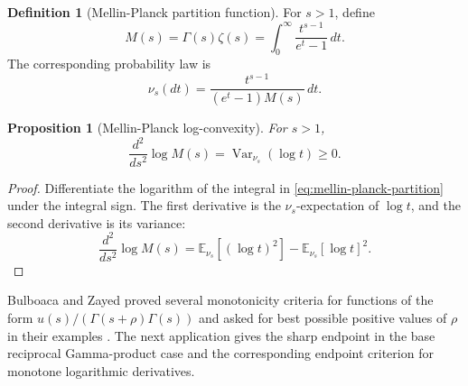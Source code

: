 \documentclass[11pt]{article}
\numberwithin{equation}{section}
\newtheorem{proposition}[theorem]{Proposition}
\theoremstyle{definition}
\newtheorem{definition}[theorem]{Definition}
\theoremstyle{remark}
\DeclareMathOperator{\Var}{Var}
\newcommand{\E}{\mathbb E}
\newcommand{\1}{\mathbf 1}
\begin{document}
\begin{definition}[Mellin-Planck partition function]
\label{def:mellin-planck-partition}
For \(s>1\), define
\begin{equation}
\label{eq:mellin-planck-partition}
M(s)=\Gamma(s)\zeta(s)
=\int_0^\infty\frac{t^{s-1}}{e^t-1}\,dt.
\end{equation}
The corresponding probability law is
\begin{equation}
\label{eq:mellin-planck-law}
\nu_s(dt)=\frac{t^{s-1}}{(e^t-1)M(s)}\,dt.
\end{equation}
\end{definition}

\begin{proposition}[Mellin-Planck log-convexity]
\label{prop:mellin-planck-log-convexity}
For \(s>1\),
\begin{equation}
\label{eq:mellin-planck-log-convexity}
\frac{d^2}{ds^2}\log M(s)=\Var_{\nu_s}(\log t)\ge0.
\end{equation}
\end{proposition}

\begin{proof}
Differentiate the logarithm of the integral in \eqref{eq:mellin-planck-partition} under the integral sign.  The first derivative is the \(\nu_s\)-expectation of \(\log t\), and the second derivative is its variance:
\begin{equation}
\label{eq:mellin-planck-variance-proof}
\frac{d^2}{ds^2}\log M(s)
=\E_{\nu_s}[(\log t)^2]-\E_{\nu_s}[\log t]^2.
\end{equation}
\end{proof}

Bulboaca and Zayed proved several monotonicity criteria for functions of the form
\(u(s)/(\Gamma(s+\rho)\Gamma(s))\) and asked for best possible positive
values of \(\rho\) in their examples \cite{bulboaca-zayed-gamma}.  The next
application gives the sharp endpoint in the base reciprocal Gamma-product
case and the corresponding endpoint criterion for monotone logarithmic
derivatives.
\end{document}
